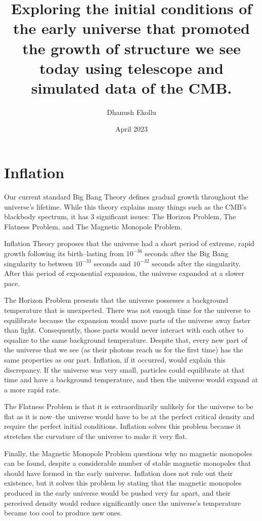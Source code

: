 \documentclass[12pt]{article}
\title{Exploring the initial conditions of the early universe that promoted the growth of structure we see today using telescope and simulated data of the CMB.}
\author{Dhanush Ekollu}
\date{April 2023}
\begin{document}
\maketitle

\section{Inflation}
Our current standard Big Bang Theory defines gradual growth throughout the universe’s lifetime. While this theory explains many things such as the CMB’s blackbody spectrum, it has 3 significant issues: The Horizon Problem, The Flatness Problem, and The Magnetic Monopole Problem. 

Inflation Theory proposes that the universe had a short period of extreme, rapid growth following its birth–lasting from $10^{-36}$ seconds after the Big Bang singularity to between $10^{-33}$ seconds and $10^{-32}$ seconds after the singularity. After this period of exponential expansion, the universe expanded at a slower pace.

The Horizon Problem presents that the universe possesses a background temperature that is unexpected. There was not enough time for the universe to equilibrate because the expansion would move parts of the universe away faster than light. Consequently, those parts would never interact with each other to equalize to the same background temperature. Despite that, every new part of the universe that we see (as their photons reach us for the first time) has the same properties as our part. Inflation, if it occurred, would explain this discrepancy. If the universe was very small, particles could equilibrate at that time and have a background temperature, and then the universe would expand at a more rapid rate. 

The Flatness Problem is that it is extraordinarily unlikely for the universe to be flat as it is now–the universe would have to be at the perfect critical density and require the perfect initial conditions. Inflation solves this problem because it stretches the curvature of the universe to make it very flat.

Finally, the Magnetic Monopole Problem questions why no magnetic monopoles can be found, despite a considerable number of stable magnetic monopoles that should have formed in the early universe. Inflation does not rule out their existence, but it solves this problem by stating that the magnetic monopoles produced in the early universe would be pushed very far apart, and their perceived density would reduce significantly once the universe's temperature became too cool to produce new ones.
\end{document}
